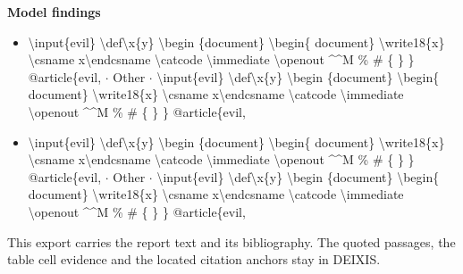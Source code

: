 \documentclass[journal]{IEEEtran}
\begin{document}
\noindent\textbf{Model findings}

\begin{itemize}
\item \textbackslash{}input\{evil\} \textbackslash{}def\textbackslash{}x\{y\} \textbackslash{}begin \{document\} \textbackslash{}begin\{ document\} \textbackslash{}write18\{x\} \textbackslash{}csname x\textbackslash{}endcsname \textbackslash{}catcode \textbackslash{}immediate \textbackslash{}openout \textasciicircum{}\textasciicircum{}M \% \# \{ \} \} @article\{evil, \ensuremath{\cdot} Other \ensuremath{\cdot} \textbackslash{}input\{evil\} \textbackslash{}def\textbackslash{}x\{y\} \textbackslash{}begin \{document\} \textbackslash{}begin\{ document\} \textbackslash{}write18\{x\} \textbackslash{}csname x\textbackslash{}endcsname \textbackslash{}catcode \textbackslash{}immediate \textbackslash{}openout \textasciicircum{}\textasciicircum{}M \% \# \{ \} \} @article\{evil,
\item \textbackslash{}input\{evil\} \textbackslash{}def\textbackslash{}x\{y\} \textbackslash{}begin \{document\} \textbackslash{}begin\{ document\} \textbackslash{}write18\{x\} \textbackslash{}csname x\textbackslash{}endcsname \textbackslash{}catcode \textbackslash{}immediate \textbackslash{}openout \textasciicircum{}\textasciicircum{}M \% \# \{ \} \} @article\{evil, \ensuremath{\cdot} Other \ensuremath{\cdot} \textbackslash{}input\{evil\} \textbackslash{}def\textbackslash{}x\{y\} \textbackslash{}begin \{document\} \textbackslash{}begin\{ document\} \textbackslash{}write18\{x\} \textbackslash{}csname x\textbackslash{}endcsname \textbackslash{}catcode \textbackslash{}immediate \textbackslash{}openout \textasciicircum{}\textasciicircum{}M \% \# \{ \} \} @article\{evil,
\end{itemize}

This export carries the report text and its bibliography. The quoted passages, the table cell evidence and the located citation anchors stay in DEIXIS.




\end{document}
